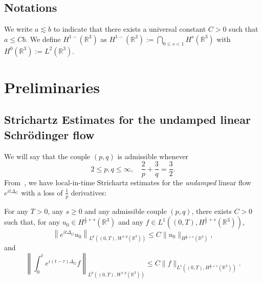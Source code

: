 \documentclass[10pt]{amsart}
\theoremstyle{definition}\newtheorem{defi}[theo]{Definition}\newtheorem{rema}[theo]{Remark}\newtheorem{exam}[theo]{Example}\newtheorem{exem}[theo]{Example}\newtheorem{nota}[theo]{Notation}
\newcommand*\R{\mathbb{R}}
\begin{document}
\subsection*{Notations}

We write $a \lesssim b$ to indicate that there exists a universal constant $C>0$ such that $a \leq Cb$. We define $H^{1-}(\R^3)$ as $H^{1-}(\R^3) := \bigcap_{0\leq s<1} H^s(\R^3)$ with $H^0(\R^3) := L^2(\R^3)$.


\section{Preliminaries}\label{secPrelim}

\subsection{Strichartz Estimates for the undamped linear Schr{\"o}dinger flow}


We will say that the couple $(p,q)$ is admissible whenever
\begin{equation}\label{eq:StrichS}
2\leq p, q \leq \infty, \quad \frac 2 p + \frac 3 q = \frac 3 2.
\end{equation}
From~\cite{BuGeTz04}, we have local-in-time Strichartz estimates for the \emph{undamped} linear flow $e^{ i t \Delta_G}$ with a loss of $\frac 1p$ derivatives:

\begin{prop}\label{prop:strich}
For any $T >0$, any $s \geq 0$ and any admissible couple $(p,q)$, there exists $C>0$ such that, for any $u_0 \in H^{\frac 1p + s}(\R^3)$ and any $f \in L^1((0,T), H^{\frac 1p + s}(\R^3))$,
\begin{equation}\label{eq:StrLossHom}
\left\| e^{ i t \Delta_G} u_0 \right\|_{L^p\left((0,T),W^{s,q}(\R^3)\right)} \leq C \| u_0 \|_{H^{ \frac 1p + s}(\R^3)},
\end{equation}
and
\begin{equation}\label{eq:NonHomDG}
\left\| \int_0^t e^{i(t- \tau) \Delta_G} f \right\|_{L^p\left((0,T),W^{s,q}(\R^3)\right)} \leq C \| f \|_{L^1\left((0,T), H^{\frac 1p + s}(\R^3)\right)}.
\end{equation}
\end{prop}
\end{document}
